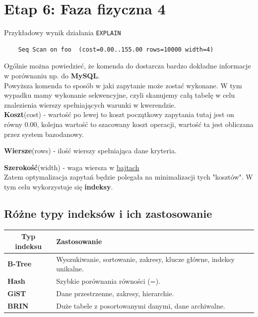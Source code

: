 \documentclass{article}
\begin{document}
\section{Etap 6: Faza fizyczna 4}

Przykładowy wynik działania \texttt{EXPLAIN}

\begin{verbatim}
    Seq Scan on foo  (cost=0.00..155.00 rows=10000 width=4)
\end{verbatim}

Ogólnie można powiedzieć, że komenda do dostarcza bardzo dokładne informacje w porównaniu np. do \textbf{MySQL}.\\

Powyższa komenda to sposób w jaki zapytanie może zostać wykonane. W tym wypadku mamy wykonanie sekwencyjne, czyli skanujemy całą tabelę w celu znalezienia wierszy spełniających warunki w kwerendzie.\\

\textbf{Koszt}(cost) - wartość po lewej to koszt początkowy zapytania tutaj jest on równy 0.00, kolejna wartość to szacowany koszt operacji, wartość ta jest obliczana przez system bazodanowy.

\textbf{Wiersze}(rows) - ilość wierszy spełniająca dane kryteria.

\textbf{Szerokość}(width) - waga wiersza w \underline{bajtach}\\

Zatem optymalizacja zapytań będzie polegała na minimalizacji tych "kosztów". W tym celu wykorzystuje się \textbf{indeksy}. \\

\subsection{Różne typy indeksów i ich zastosowanie}

\begin{table}[htbp]
    \begin{tabular}{|l|l|}
        \hline
        \multicolumn{1}{|c|}{\textbf{Typ indeksu}} & \textbf{Zastosowanie}                                               \\ \hline
        \textbf{B-Tree}                            & Wyszukiwanie, sortowanie, zakresy, klucze główne, indeksy unikalne. \\ \hline
        \textbf{Hash}                              & Szybkie porównania równości (=).                                    \\ \hline
        \textbf{GiST}                              & Dane przestrzenne, zakresy, hierarchie.                             \\ \hline
        \textbf{BRIN}                              & Duże tabele z posortowanymi danymi, dane archiwalne.                \\ \hline
    \end{tabular}
\end{table}
\end{document}
